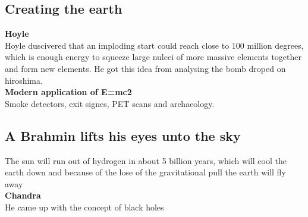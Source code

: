 \documentclass{article}
\begin{document}
\subsection{Creating the earth}
\textbf{Hoyle} \\
Hoyle duscivered that an imploding start could reach close to 100 million degrees, which is enough energy to squeeze large nulcei of more massive elements together and form new elements. He got this idea from analysing the bomb droped on hiroshima. \\
\textbf{Modern application of E=mc2} \\
Smoke detectors, exit signes, PET scans and archaeology.
\subsection{A Brahmin lifts his eyes unto the sky}
The sun will run out of hydrogen in about 5 billion years, which will cool the earth down and because of the lose of the gravitational pull the earth will fly away\\
\textbf{Chandra} \\
He came up with the concept of black holes
\end{document}
